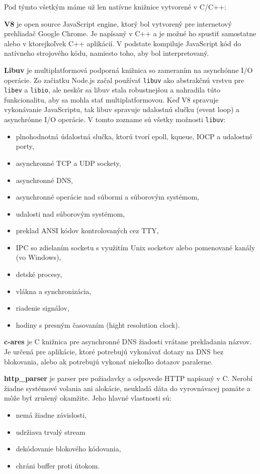 \noindent Pod týmto všetkým máme už len natívne knižnice vytvorené v C/C++:

\textbf{V8} je open source JavaScript engine, ktorý bol vytvorený pre internetový prehliadač Google Chrome. Je napísaný v C++ a je možné ho spustiť samostatne alebo v ktorejkoľvek C++ aplikácií. V podstate kompiluje JavaScript kód do natívneho strojového kódu, namiesto toho, aby bol interpretovaný.

\textbf{Libuv} je multiplatformová podporná knižnica so zameraním na asynchónne I/O operácie. Zo začiatku Node.js začal používať \verb|libuv| ako abstrakčnú vrstvu pre \verb|libev| a \verb|libio|, ale neskôr sa libuv stala robustnejšou a nahradila túto funkcionalitu, aby sa mohla stať multiplatformovou. Keď V8 spravuje vykonávanie JavaScriptu, tak libuv spravuje udalostnú slučku (event loop) a asynchrónne I/O operácie. V tomto zozname sú všetky možnosti \verb|libuv|:
\begin{itemize}
\item plnohodnotná údalostná slučka, ktorú tvorí epoll, kqueue, IOCP a udalostné porty,
\item asynchronné TCP a UDP sockety,
\item asynchronné DNS,
\item asynchronné operácie nad súbormi a súborovým systémom,
\item udalosti nad súborovým systémom,
\item preklad ANSI kódov kontrolovaných cez TTY,
\item IPC so zdielaním socketu s využitím Unix socketov alebo pomenované kanály (vo Windows),
\item detské procesy,
\item vlákna a synchronizácia,
\item riadenie signálov,
\item hodiny s presným časovaním (hight resolution clock).
\end{itemize}

\textbf{c-ares} je C knižnica pre asynchronné DNS žiadosti vrátane prekladania názvov. Je určená pre aplikácie, ktoré potrebujú vykonávať dotazy na DNS bez blokovania, alebo ak potrebujú vykonať niekoľko dotazov paralerne.

\textbf{http\_parser} je parser pre požiadavky a odpovede HTTP napísaný v C. Nerobí žiadne systémové volania ani alokácie, neukladá dáta do vyrovnávacej pamäte a môže byť zrušený okamžite. Jeho hlavné vlastnosti sú:
\begin{itemize}
\item nemá žiadne závislosti,
\item udržiava trvalý stream
\item dekódovanie blokového kódovania,
\item chráni buffer proti útokom.
\end{itemize}

